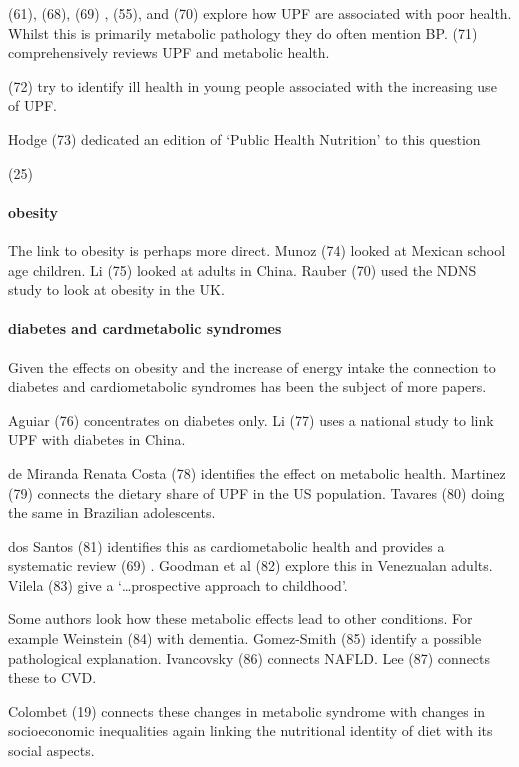 \documentclass[
]{article}
\begin{document}
(61), (68), (69) , (55), and (70) explore how UPF are associated with
poor health. Whilst this is primarily metabolic pathology they do often
mention BP. (71) comprehensively reviews UPF and metabolic health.

(72) try to identify ill health in young people associated with the
increasing use of UPF.

Hodge (73) dedicated an edition of `Public Health Nutrition' to this
question

(25)

\hypertarget{obesity}{%
\paragraph{obesity}\label{obesity}}

The link to obesity is perhaps more direct. Munoz (74) looked at Mexican
school age children. Li (75) looked at adults in China. Rauber (70) used
the NDNS study to look at obesity in the UK.

\hypertarget{diabetes-and-cardmetabolic-syndromes}{%
\paragraph{diabetes and cardmetabolic
syndromes}\label{diabetes-and-cardmetabolic-syndromes}}

Given the effects on obesity and the increase of energy intake the
connection to diabetes and cardiometabolic syndromes has been the
subject of more papers.

Aguiar (76) concentrates on diabetes only. Li (77) uses a national study
to link UPF with diabetes in China.

de Miranda Renata Costa (78) identifies the effect on metabolic health.
Martinez (79) connects the dietary share of UPF in the US population.
Tavares (80) doing the same in Brazilian adolescents.

dos Santos (81) identifies this as cardiometabolic health and provides a
systematic review (69) . Goodman et al (82) explore this in Venezualan
adults. Vilela (83) give a `\ldots prospective approach to childhood'.

Some authors look how these metabolic effects lead to other conditions.
For example Weinstein (84) with dementia. Gomez-Smith (85) identify a
possible pathological explanation. Ivancovsky (86) connects NAFLD. Lee
(87) connects these to CVD.

Colombet (19) connects these changes in metabolic syndrome with changes
in socioeconomic inequalities again linking the nutritional identity of
diet with its social aspects.
\end{document}
